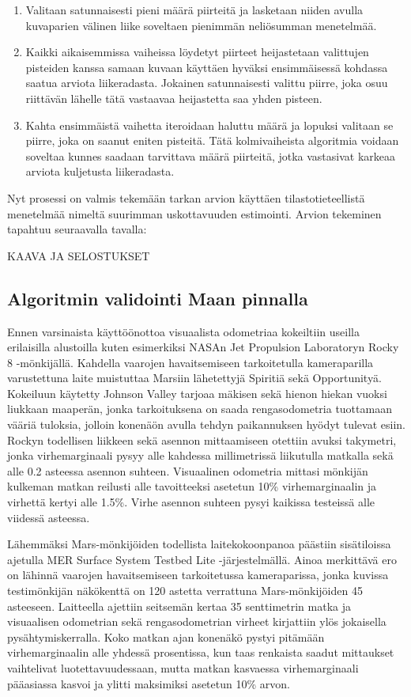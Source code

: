 \documentclass[finnish]{tktltiki2}
\theoremstyle{definition}
\theoremstyle{remark}
\begin{document}
\begin{enumerate}
\item Valitaan satunnaisesti pieni määrä piirteitä ja lasketaan niiden avulla kuvaparien välinen liike soveltaen pienimmän neliösumman menetelmää.

\item Kaikki aikaisemmissa vaiheissa löydetyt piirteet heijastetaan valittujen pisteiden kanssa samaan kuvaan käyttäen hyväksi ensimmäisessä kohdassa saatua arviota liikeradasta. Jokainen satunnaisesti valittu piirre, joka osuu riittävän lähelle tätä vastaavaa heijastetta saa yhden pisteen.

\item Kahta ensimmäistä vaihetta iteroidaan haluttu määrä ja lopuksi valitaan se piirre, joka on saanut eniten pisteitä. Tätä kolmivaiheista algoritmia voidaan soveltaa kunnes saadaan tarvittava määrä piirteitä, jotka vastasivat karkeaa arviota kuljetusta liikeradasta.
\end{enumerate}

Nyt prosessi on valmis tekemään tarkan arvion käyttäen tilastotieteellistä menetelmää nimeltä suurimman uskottavuuden estimointi. Arvion tekeminen tapahtuu seuraavalla tavalla:

KAAVA JA SELOSTUKSET

\subsection{Algoritmin validointi Maan pinnalla}
Ennen varsinaista käyttöönottoa visuaalista odometriaa kokeiltiin useilla erilaisilla alustoilla kuten esimerkiksi NASAn Jet Propulsion Laboratoryn Rocky 8 -mönkijällä. Kahdella vaarojen havaitsemiseen tarkoitetulla kameraparilla varustettuna laite muistuttaa Marsiin lähetettyjä Spiritiä sekä Opportunityä. Kokeiluun käytetty Johnson Valley tarjoaa mäkisen sekä hienon hiekan vuoksi liukkaan maaperän, jonka tarkoituksena on saada rengasodometria tuottamaan vääriä tuloksia, jolloin konenäön avulla tehdyn paikannuksen hyödyt tulevat esiin. Rockyn todellisen liikkeen sekä asennon mittaamiseen otettiin avuksi takymetri, jonka virhemarginaali pysyy alle kahdessa millimetrissä liikutulla matkalla sekä alle 0.2 asteessa asennon suhteen. Visuaalinen odometria mittasi mönkijän kulkeman matkan reilusti alle tavoitteeksi asetetun 10\% virhemarginaalin ja virhettä kertyi alle 1.5\%. Virhe asennon suhteen pysyi kaikissa testeissä alle viidessä asteessa.

Lähemmäksi Mars-mönkijöiden todellista laitekokoonpanoa päästiin sisätiloissa ajetulla MER Surface System Testbed Lite -järjestelmällä. Ainoa merkittävä ero on lähinnä vaarojen havaitsemiseen tarkoitetussa kameraparissa, jonka kuvissa testimönkijän näkökenttä on 120 astetta verrattuna Mars-mönkijöiden 45 asteeseen. Laitteella ajettiin seitsemän kertaa 35 senttimetrin matka ja visuaalisen odometrian sekä rengasodometrian virheet kirjattiin ylös jokaisella pysähtymiskerralla. Koko matkan ajan konenäkö pystyi pitämään virhemarginaalin alle yhdessä prosentissa, kun taas renkaista saadut mittaukset vaihtelivat luotettavuudessaan, mutta matkan kasvaessa virhemarginaali pääasiassa kasvoi ja ylitti maksimiksi asetetun 10\% arvon.
\end{document}
